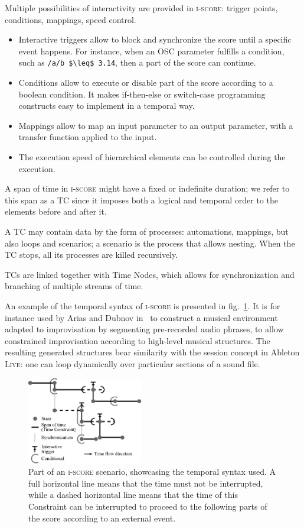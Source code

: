 \documentclass{article}
\newcommand*{\iscore}{\textsc{i-score}\xspace}
\newcommand*{\abletonlive}{Ableton \textsc{Live}\xspace}
\newcommand*{\timeconstraint}{\ac{TC}\xspace}
\newcommand*{\timeconstraints}{\acp{TC}\xspace}
\begin{document}
Multiple possibilities of interactivity are provided in \iscore: trigger points, conditions, 
mappings, speed control.
\begin{itemize}
    \item Interactive triggers allow to block and synchronize the score until a specific event happens.
    For instance, when an OSC parameter fulfills a condition, such as  \lstinline[mathescape]!/a/b $\leq$ 3.14!, then 
    a part of the score can continue.
    \item Conditions allow to execute or disable part of the score according to a boolean condition.
    It makes if-then-else or switch-case programming constructs easy to implement in a temporal way.
    \item Mappings allow to map an input parameter to an output parameter, with a transfer function applied to the input.
    \item The execution speed of hierarchical elements can be controlled during the execution.
\end{itemize}

A span of time in \iscore might have a fixed or indefinite duration;
we refer to this span as a \timeconstraint since it imposes both a logical and temporal order to the elements before and after it.
 
A \timeconstraint may contain data by the form of processes: automations, mappings, but also loops and scenarios; a scenario is the process that allows nesting. 
When the \timeconstraint stops, all its processes are killed recursively.

\timeconstraints are linked together with Time Nodes, which allows for synchronization and branching of multiple streams of time.

An example of the temporal syntax of \iscore is presented in fig.~\ref{fig.iscore-example}.
It is for instance used by Arias and Dubnov in~\cite{Arias:VMO-Score} to construct a musical environment adapted to improvisation by segmenting pre-recorded audio phrases, to allow constrained improvisation according to high-level musical structures.
The resulting generated structures bear similarity with the session concept in \abletonlive: one can loop dynamically over particular sections of a sound file. 

\begin{figure}
	\centering
	\includegraphics[width=0.45\textwidth]{figures/iscore-example.eps}
	\caption{Part of an \iscore scenario, showcasing the temporal syntax used. 
		A full horizontal line means that the time must not be interrupted, 
		while a dashed horizontal line means that the time of this Constraint can be interrupted to proceed 
		to the following parts of the score according to an external event.}
	\label{fig.iscore-example}
\end{figure}
\end{document}
